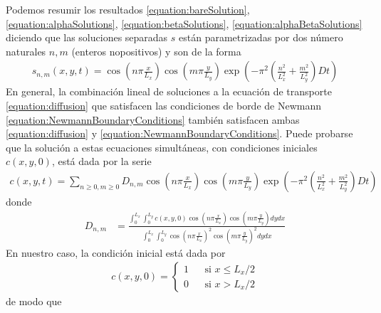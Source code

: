 \documentclass{article}
\begin{document}
  Podemos resumir los resultados
  \eqref{equation:bareSolution}, \eqref{equation:alphaSolutions}, \eqref{equation:betaSolutions}, \eqref{equation:alphaBetaSolutions}
  diciendo que las soluciones separadas \(s\) están parametrizadas por dos número naturales \(n, m\) (enteros nopositivos) y son de la forma
  \begin{align}
    \label{equation:totalSolution}
    s_{n, m}(x, y, t)
    =
    \cos\left( n \pi \frac{x}{L_x} \right)
    \cos\left( m \pi \frac{y}{L_y} \right)
    \exp\left( - \pi^2 \left( \frac{n^2}{L_x^2} + \frac{m^2}{L_y^2} \right) D t \right)
  \end{align}
  En general, la combinación lineal de soluciones a la ecuación de transporte \eqref{equation:diffusion} que satisfacen las condiciones de borde de Newmann \eqref{equation:NewmannBoundaryConditions} también satisfacen ambas \eqref{equation:diffusion} y \eqref{equation:NewmannBoundaryConditions}.
  Puede probarse que la solución a estas ecuaciones simultáneas, con condiciones iniciales \(c(x, y, 0)\), está dada por la serie
  \begin{align}
    c(x, y, t)
    =
    \sum_{n \geq 0, m \geq 0}
    D_{n, m}
    \cos\left( n \pi \frac{x}{L_x} \right)
    \cos\left( m \pi \frac{y}{L_y} \right)
    \exp\left( - \pi^2 \left( \frac{n^2}{L_x^2} + \frac{m^2}{L_y^2} \right) D t \right)
  \end{align}
  donde
  \begin{align}
    D_{n, m}
    &=
    \frac{
      \int_0^{L_x}
        \int_0^{L_y}
          c(x, y, 0)
          \cos\left( n \pi \frac{x}{L_x} \right)
          \cos\left( m \pi \frac{y}{L_y} \right)
        d y
      d x
    }{
      \int_0^{L_x}
        \int_0^{L_y}
        \cos\left( n \pi \frac{x}{L_x} \right)^2
        \cos\left( m \pi \frac{y}{L_y} \right)^2
        d y
      d x
    }
  \end{align}
  En nuestro caso, la condición inicial está dada por 
  \begin{align}
    \label{equation:initialCondition}
    c(x, y, 0)
    =
    \left\{
      \begin{aligned}
        1 &&\text{si } x \leq L_x /2 \\
        0 &&\text{si } x > L_x / 2
      \end{aligned}
    \right.
  \end{align}
  de modo que
\end{document}
